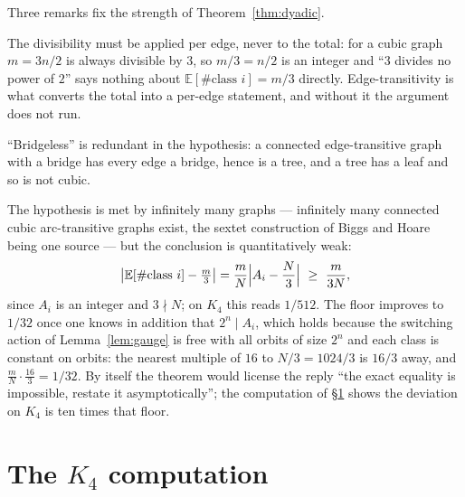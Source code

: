 \documentclass[11pt]{amsart}
\begin{document}
Three remarks fix the strength of Theorem~\ref{thm:dyadic}.

The divisibility must be applied per edge, never to the total: for a cubic
graph $m=3n/2$ is always divisible by $3$, so $m/3=n/2$ is an integer and
``$3$ divides no power of $2$'' says nothing about
$\mathbb{E}[\#\text{class }i]=m/3$ directly. Edge-transitivity is what converts
the total into a per-edge statement, and without it the argument does not run.

``Bridgeless'' is redundant in the hypothesis: a connected edge-transitive
graph with a bridge has every edge a bridge, hence is a tree, and a tree has a
leaf and so is not cubic.

The hypothesis is met by infinitely many graphs --- infinitely many connected
cubic arc-transitive graphs exist, the sextet construction of Biggs and Hoare
\cite{BH} being one source --- but the conclusion is quantitatively weak:
\[
 \bigl|\mathbb{E}[\#\text{class }i]-\tfrac{m}{3}\bigr|
 =\frac{m}{N}\Bigl|A_i-\frac{N}{3}\Bigr|\ \ge\ \frac{m}{3N},
\]
since $A_i$ is an integer and $3\nmid N$; on $K_4$ this reads $1/512$. The floor
improves to $1/32$ once one knows in addition that $2^{n}\mid A_i$, which holds
because the switching action of Lemma~\ref{lem:gauge} is free with all orbits of
size $2^{n}$ and each class is constant on orbits: the nearest multiple of $16$
to $N/3=1024/3$ is $16/3$ away, and $\tfrac{m}{N}\cdot\tfrac{16}{3}=1/32$.
By itself the theorem would license the reply
``the exact equality is impossible, restate it asymptotically''; the
computation of \S\ref{sec:k4} shows the deviation on $K_4$ is ten times that
floor.

\section{The \texorpdfstring{$K_4$}{K4} computation}\label{sec:k4}
\end{document}
